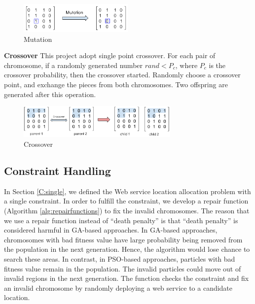 \begin{figure}[!ht]
\centering
	\includegraphics[width=0.5\textwidth]{pics/mutation.png}
\caption{Mutation}
\label{graph1}
\end{figure}

\begin{flushleft}\textbf{Crossover} This project adopt single point crossover. For each pair of chromosome, if a randomly generated number $rand < P_c$, where
$P_c$ is the crossover probability, then the crossover started.  Randomly choose a crossover point, and exchange the pieces from both chromosomes. Two offspring
are generated after this operation.
\end{flushleft}
                                   

\begin{figure}[!ht]
\centering
  \includegraphics[width=0.7\textwidth]{pics/crossover.png}
\caption{Crossover}
\label{graph2}
\end{figure}

\subsection{Constraint Handling}
In Section \ref{C:single}, we defined the Web service location allocation problem with a single constraint. In order to fulfill the constraint,
we develop a repair function (Algorithm \ref{alg:repairfunctions}) to fix the invalid chromosomes. The reason that we use a repair function instead of
``death penalty'' is that ``death penalty'' is considered harmful in GA-based approaches. In GA-based approaches, chromosomes with bad fitness value
have large probability being removed from the population in the next generation. Hence, the algorithm would lose chance to search these areas. In contrast, 
in PSO-based approaches, particles with bad fitness value remain in the population. The invalid particles could move out of invalid regions in the next generation.
The function checks the constraint and fix an invalid chromosome by randomly deploying a web service to a candidate location.

